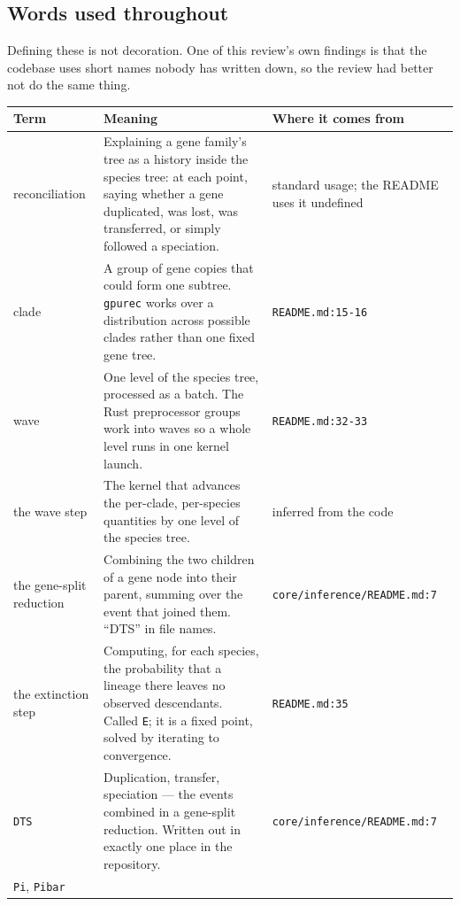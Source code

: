 \documentclass[11pt]{article}
\newcommand{\loc}[1]{\nolinkurl{#1}}
\begin{document}
\subsection{Words used throughout}

Defining these is not decoration.  One of this review's own findings is that the
codebase uses short names nobody has written down, so the review had better not
do the same thing.

\begin{center}
\begin{longtable}{@{}p{}p{}p{}@{}}
\toprule
Term & Meaning & Where it comes from \\
\midrule
\endhead
reconciliation
  & Explaining a gene family's tree as a history inside the species tree: at
    each point, saying whether a gene duplicated, was lost, was transferred, or
    simply followed a speciation.
  & standard usage; the README uses it undefined \\
clade
  & A group of gene copies that could form one subtree.  \texttt{gpurec} works
    over a distribution across possible clades rather than one fixed gene tree.
  & \loc{README.md:15-16} \\
wave
  & One level of the species tree, processed as a batch.  The Rust preprocessor
    groups work into waves so a whole level runs in one kernel launch.
  & \loc{README.md:32-33} \\
the wave step
  & The kernel that advances the per-clade, per-species quantities by one level
    of the species tree.
  & inferred from the code \\
the gene-split reduction
  & Combining the two children of a gene node into their parent, summing over
    the event that joined them.  ``DTS'' in file names.
  & \loc{core/inference/README.md:7} \\
the extinction step
  & Computing, for each species, the probability that a lineage there leaves no
    observed descendants.  Called \texttt{E}; it is a fixed point, solved by
    iterating to convergence.
  & \loc{README.md:35} \\
\texttt{DTS}
  & Duplication, transfer, speciation --- the events combined in a gene-split
    reduction.  Written out in exactly one place in the repository.
  & \loc{core/inference/README.md:7} \\
\texttt{Pi}, \texttt{Pibar}

\end{longtable}
\end{center}
\end{document}

